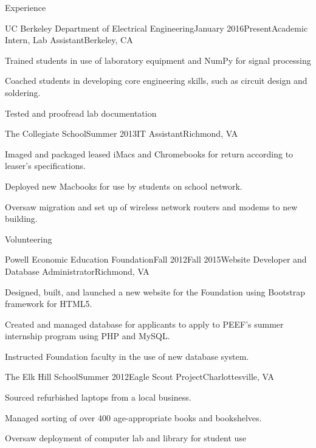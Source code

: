 \documentclass{resume} %
\begin{document}
\begin{rSection}{Experience}
\begin{rSubsection}{UC Berkeley Department of Electrical Engineering}{January 2016\textminus Present}{Academic Intern, Lab Assistant}{Berkeley, CA}
\item Trained students in use of laboratory equipment and NumPy for signal processing
\item Coached students in developing core engineering skills, such as circuit design and soldering.
\item Tested and proofread lab documentation
\end{rSubsection}
\begin{rSubsection}{The Collegiate School}{Summer 2013}{IT Assistant}{Richmond, VA}
\item Imaged and packaged leased iMacs and Chromebooks for return according to leaser's specifications.
\item Deployed new Macbooks for use by students on school network.
\item Oversaw migration and set up of wireless network routers and modems to new building.
\end{rSubsection}
\end{rSection}


\begin{rSection}{Volunteering}

\begin{rSubsection}{Powell Economic Education Foundation}{Fall 2012\textminus Fall 2015}{Website Developer and Database Administrator}{Richmond, VA}
\item Designed, built, and launched a new website for the Foundation using Bootstrap framework for HTML5.
\item Created and managed database for applicants to apply to PEEF's summer internship program using PHP and MySQL.
\item Instructed Foundation faculty in the use of new database system.
\end{rSubsection}
\begin{rSubsection}{The Elk Hill School}{Summer 2012}{Eagle Scout Project}{Charlottesville, VA}
\item Sourced refurbished laptops from a local business.
\item Managed sorting of over 400 age-appropriate books and bookshelves.
\item Oversaw deployment of computer lab and library for student use
\end{rSubsection}
\end{rSection}
\end{document}
